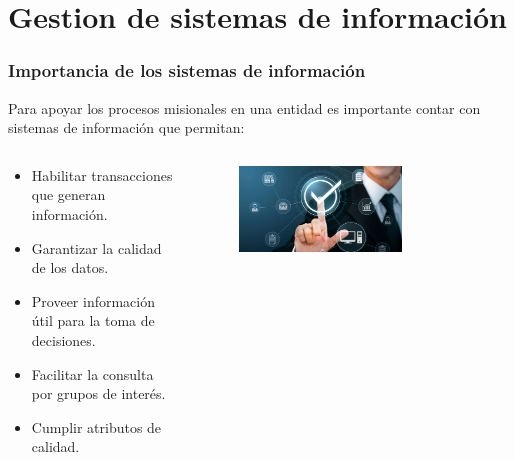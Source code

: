 \section{Gestion de sistemas de información}

\insertsectionpage



\begin{frame}
		
   \frametitle{Importancia de los sistemas de información}

   Para apoyar los procesos misionales en una entidad es importante contar con sistemas de información que permitan:
\begin{columns}
    \begin{column}{.5\textwidth}
      \begin{itemize}	
        \item Habilitar transacciones que generan información.
        \item Garantizar la calidad de los datos.
        \item Proveer información útil para la toma de decisiones.
        \item Facilitar la consulta por grupos de interés.
	\item  Cumplir atributos de calidad.
      \end{itemize}
    \end{column}

    \begin{column}{.5\textwidth}
      \begin{figure}[ht]
        \centering
        \includegraphics[width=0.7\textwidth]{img/importancia.png}
      \end{figure}
    \end{column}
  \end{columns}

\end{frame}


